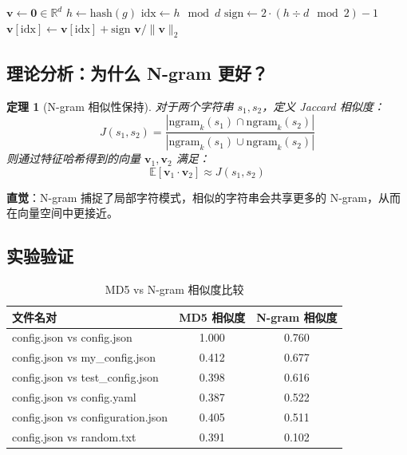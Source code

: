 \documentclass[12pt,a4paper]{article}
\newtheorem{theorem}{定理}[section]
\begin{document}
\begin{algorithm}
\caption{N-gram 向量化}
\begin{algorithmic}[1]
    \State $\mathbf{v} \gets \mathbf{0} \in \mathbb{R}^d$
            \State $h \gets \text{hash}(g)$
            \State $\text{idx} \gets h \mod d$
            \State $\text{sign} \gets 2 \cdot (h \div d \mod 2) - 1$
            \State $\mathbf{v}[\text{idx}] \gets \mathbf{v}[\text{idx}] + \text{sign}$
        \EndFor
    \EndFor
    \State \Return $\mathbf{v} / \|\mathbf{v}\|_2$ 
\EndProcedure
\end{algorithmic}
\end{algorithm}

\subsection{理论分析：为什么 N-gram 更好？}

\begin{theorem}[N-gram 相似性保持]
对于两个字符串 $s_1, s_2$，定义 Jaccard 相似度：
\begin{equation}
J(s_1, s_2) = \frac{|\text{ngram}_k(s_1) \cap \text{ngram}_k(s_2)|}{|\text{ngram}_k(s_1) \cup \text{ngram}_k(s_2)|}
\end{equation}
则通过特征哈希得到的向量 $\mathbf{v}_1, \mathbf{v}_2$ 满足：
\begin{equation}
\mathbb{E}[\mathbf{v}_1 \cdot \mathbf{v}_2] \approx J(s_1, s_2)
\end{equation}
\end{theorem}

\textbf{直觉}：N-gram 捕捉了局部字符模式，相似的字符串会共享更多的 N-gram，从而在向量空间中更接近。

\subsection{实验验证}

\begin{table}[h]
\centering
\begin{tabular}{@{}lcc@{}}
\toprule
\textbf{文件名对} & \textbf{MD5 相似度} & \textbf{N-gram 相似度} \\
\midrule
config.json vs config.json & 1.000 & 0.760 \\
config.json vs my\_config.json & 0.412 & 0.677 \\
config.json vs test\_config.json & 0.398 & 0.616 \\
config.json vs config.yaml & 0.387 & 0.522 \\
config.json vs configuration.json & 0.405 & 0.511 \\
config.json vs random.txt & 0.391 & 0.102 \\
\bottomrule
\end{tabular}
\caption{MD5 vs N-gram 相似度比较}
\end{table}
\end{document}
